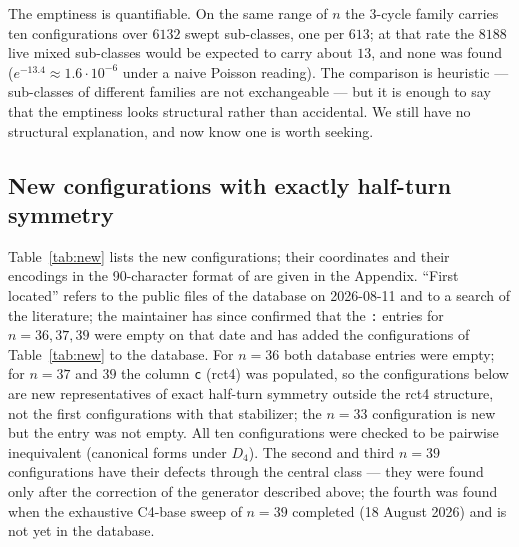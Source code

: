 \documentclass[11pt]{article}
\theoremstyle{remark}
\newcommand{\Dfour}{D_4}
\begin{document}
The emptiness is quantifiable.  On the same range of $n$ the $3$-cycle family carries ten configurations over $6132$
swept sub-classes, one per $613$; at that rate the $8188$ live mixed sub-classes would be expected to carry about $13$,
and none was found ($e^{-13.4}\approx1.6\cdot10^{-6}$ under a naive Poisson reading).  The comparison is heuristic ---
sub-classes of different families are not exchangeable --- but it is enough to say that the emptiness looks structural
rather than accidental.  We still have no structural explanation, and now know one is worth seeking.

\subsection{New configurations with exactly half-turn symmetry}
Table~\ref{tab:new} lists the new configurations; their coordinates and their encodings in the 90-character format of
\cite{FlammenkampDB} are given in the Appendix.  ``First located'' refers to the public files of the database on 2026-08-11 and to a search of the literature; the maintainer
has since confirmed that the \texttt{:} entries for $n=36,37,39$ were empty on that date and has added the configurations of
Table~\ref{tab:new} to the database.  For $n=36$ both database entries were empty; for $n=37$ and $39$ the
column \texttt{c} (rct4) was populated, so the configurations below are new representatives of exact half-turn symmetry
outside the rct4 structure, not the first configurations with that stabilizer; the $n=33$ configuration is new but the entry
was not empty.  All ten configurations were checked to be pairwise inequivalent (canonical forms under $\Dfour$).  The
second and third $n=39$ configurations have their defects through the central class --- they were found only after the
correction of the generator described above; the fourth was found when the exhaustive C4-base sweep of $n=39$ completed
(18 August 2026) and is not yet in the database.
\end{document}
